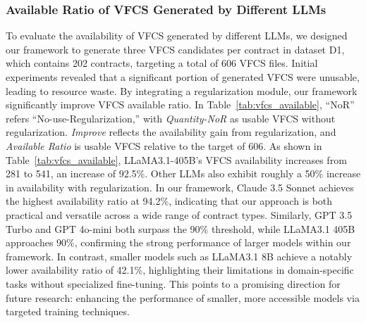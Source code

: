 \documentclass[sigconf]{acmart}
\begin{document}
\begin{sloppypar}
\vspace{-2pt}
\subsubsection{Available Ratio of VFCS Generated by Different LLMs}
To evaluate the availability of VFCS generated by different LLMs,
we designed our framework to generate three VFCS candidates per contract in dataset D1,
which contains 202 contracts, targeting a total of 606 VFCS files.
Initial experiments revealed that a significant portion of generated VFCS were unusable, leading to resource waste. By integrating a regularization module, our framework significantly improve VFCS available ratio. 
In Table~\ref{tab:vfcs_available}, “NoR” refers “No-use-Regularization,” with \textit{Quantity-NoR} as usable VFCS without regularization. \textit{Improve} reflects the availability gain from regularization, and \textit{Available Ratio} is usable VFCS relative to the target of 606.
As shown in Table~\ref{tab:vfcs_available}, LLaMA3.1-405B’s VFCS availability increases from 281 to 541, an increase of 92.5\%. Other LLMs also exhibit roughly a 50\% increase in availability with regularization.
%
In our framework, Claude 3.5 Sonnet achieves the highest availability ratio at 94.2\%, indicating that our approach is both practical and versatile across a wide range of contract types.
%
%
Similarly, GPT 3.5 Turbo and GPT 4o-mini both surpass the 90\% threshold, while LLaMA3.1 405B approaches 90\%, confirming the strong performance of larger models within our framework. In contrast, smaller models such as LLaMA3.1 8B achieve a notably lower availability ratio of 42.1\%, highlighting their limitations in domain-specific tasks without specialized fine-tuning. This points to a promising direction for future research: enhancing the performance of smaller, more accessible models via targeted training techniques.




\end{sloppypar}
\end{document}
